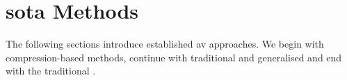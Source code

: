 \section{\Acl{sota} Methods}
\label{sec:sota_methods}

The following sections introduce established \ac{av} approaches.
We begin with compression-based methods, continue with traditional and generalised \unmasking{} and end with the traditional \impAppr{}.




  
